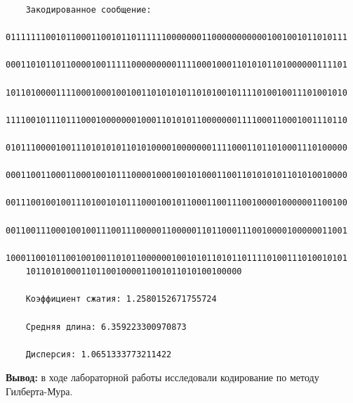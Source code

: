 \documentclass[a4paper,14pt]{extarticle}
\begin{document}
\begin{enumerate}
\begin{verbatim}
    Закодированное сообщение: 
    01111111001011000110010110111111000000011000000000001001001011010111
    00011010110110000100111110000000001111000100011010101101000000111101
    10110100001111000100010010011010101011010100101111010010011101001010
    11110010111011100010000000100011010101100000001111000110001001110110
    01011100001001110101010110101000010000000111100011011010001110100000
    00011001100011000100101110000100010010100011001101010101101010010000
    00111001001001110100101011100010010110001100111001000010000001100100
    00110011100010010011100111000001100000110110001110010000100000011001
    10001100101100100100110101100000010010101101011011110100111010010101
    1011010100011011001000011001011010100100000
    
    Коэффициент сжатия: 1.2580152671755724
    
    Средняя длина: 6.359223300970873
    
    Дисперсия: 1.0651333773211422
\end{verbatim}

\end{enumerate}

\textbf{Вывод: } в ходе лабораторной работы исследовали кодирование по методу Гилберта-Мура.
\end{document}
